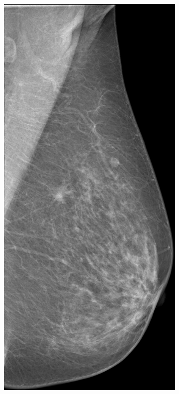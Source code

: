 \documentclass{beamer}
\begin{document}
\begin{frame}
\begin{figure}
\begin{subfigure}{0.134\textwidth}
            \end{subfigure}
            \\ \smallskip
            \begin{subfigure}{0.134\textwidth}
	            \centering
		            \includegraphics[width=\textwidth]{plots/examples/mammogram_4.png}

\end{subfigure}
\end{figure}
\end{frame}
\end{document}
